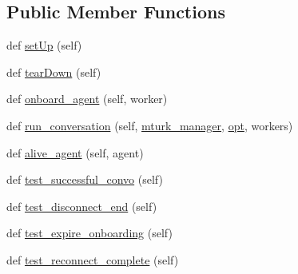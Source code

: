 \subsection*{Public Member Functions}
\begin{DoxyCompactItemize}
\item 
def \hyperlink{classparlai_1_1mturk_1_1core_1_1legacy__2018_1_1test_1_1test__full__system_1_1TestMTurkManagerWorkflows_ab361c63be767de8fd43419409a0b5b6e}{set\+Up} (self)
\item 
def \hyperlink{classparlai_1_1mturk_1_1core_1_1legacy__2018_1_1test_1_1test__full__system_1_1TestMTurkManagerWorkflows_a96dc5bc96ad19bebc578320da3423944}{tear\+Down} (self)
\item 
def \hyperlink{classparlai_1_1mturk_1_1core_1_1legacy__2018_1_1test_1_1test__full__system_1_1TestMTurkManagerWorkflows_addc7b32cde25acc733e8363e2d91d04e}{onboard\+\_\+agent} (self, worker)
\item 
def \hyperlink{classparlai_1_1mturk_1_1core_1_1legacy__2018_1_1test_1_1test__full__system_1_1TestMTurkManagerWorkflows_a0441bae10079f6823a36126581caba48}{run\+\_\+conversation} (self, \hyperlink{classparlai_1_1mturk_1_1core_1_1legacy__2018_1_1test_1_1test__full__system_1_1TestMTurkManagerWorkflows_a839a3a790373427e3b343211171a67c5}{mturk\+\_\+manager}, \hyperlink{classparlai_1_1mturk_1_1core_1_1legacy__2018_1_1test_1_1test__full__system_1_1TestMTurkManagerWorkflows_a6e01485f42a084dde205f2c2a1973d49}{opt}, workers)
\item 
def \hyperlink{classparlai_1_1mturk_1_1core_1_1legacy__2018_1_1test_1_1test__full__system_1_1TestMTurkManagerWorkflows_a3647aaf9288745bbceaf873fbbea9301}{alive\+\_\+agent} (self, agent)
\item 
def \hyperlink{classparlai_1_1mturk_1_1core_1_1legacy__2018_1_1test_1_1test__full__system_1_1TestMTurkManagerWorkflows_a296f430cd647d9d0f8f5dd600edd6d36}{test\+\_\+successful\+\_\+convo} (self)
\item 
def \hyperlink{classparlai_1_1mturk_1_1core_1_1legacy__2018_1_1test_1_1test__full__system_1_1TestMTurkManagerWorkflows_ac0466657a3df17ee6bb334696ee27d20}{test\+\_\+disconnect\+\_\+end} (self)
\item 
def \hyperlink{classparlai_1_1mturk_1_1core_1_1legacy__2018_1_1test_1_1test__full__system_1_1TestMTurkManagerWorkflows_a5301ddab598be8dd5efc3231e6f0ae75}{test\+\_\+expire\+\_\+onboarding} (self)
\item 
def \hyperlink{classparlai_1_1mturk_1_1core_1_1legacy__2018_1_1test_1_1test__full__system_1_1TestMTurkManagerWorkflows_acec734d4011e2e2815dcfa36846c5007}{test\+\_\+reconnect\+\_\+complete} (self)

\end{DoxyCompactItemize}
